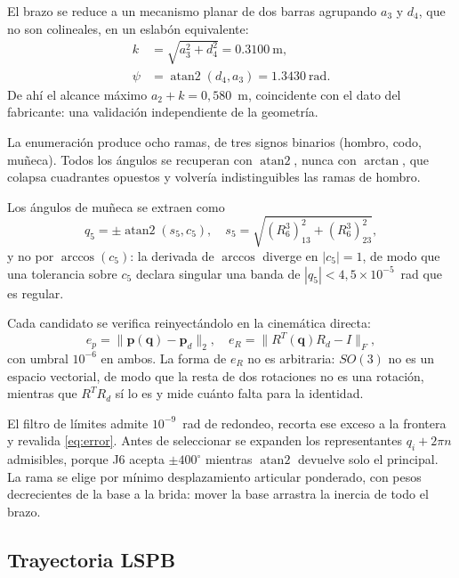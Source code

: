 \documentclass[conference]{IEEEtran}
\begin{document}
El brazo se reduce a un mecanismo planar de dos barras agrupando $a_3$ y
$d_4$, que no son colineales, en un eslabón equivalente:
\begin{equation}
\begin{split}
    k    &= \sqrt{a_3^2+d_4^2} = 0.3100~\text{m},\\
    \psi &= \operatorname{atan2}(d_4,a_3) = 1.3430~\text{rad}.
\end{split}
\label{eq:k}
\end{equation}
De ahí el alcance máximo $a_2+k = 0{,}580$~m, coincidente con el dato
del fabricante: una validación independiente de la geometría.

La enumeración produce ocho ramas, de tres signos binarios (hombro,
codo, muñeca). Todos los ángulos se recuperan con
$\operatorname{atan2}$, nunca con $\arctan$, que colapsa cuadrantes
opuestos y volvería indistinguibles las ramas de hombro.

Los ángulos de muñeca se extraen como
\begin{equation}
    q_5 = \pm\operatorname{atan2}(s_5,c_5),
    \quad s_5=\sqrt{(R^3_6)_{13}^2+(R^3_6)_{23}^2},
    \label{eq:q5}
\end{equation}
y no por $\arccos(c_5)$: la derivada de $\arccos$ diverge en
$|c_5|=1$, de modo que una tolerancia sobre $c_5$ declara singular una
banda de $|q_5|<4{,}5\times10^{-5}$~rad que es regular.

Cada candidato se verifica reinyectándolo en la cinemática directa:
\begin{equation}
    e_p = \lVert\bm{p}(\bm{q})-\bm{p}_d\rVert_2,\quad
    e_R = \lVert R^{T}(\bm{q})R_d - I\rVert_F,
    \label{eq:error}
\end{equation}
con umbral $10^{-6}$ en ambos. La forma de $e_R$ no es arbitraria:
$SO(3)$ no es un espacio vectorial, de modo que la resta de dos
rotaciones no es una rotación, mientras que $R^{T}R_d$ sí lo es y mide
cuánto falta para la identidad.

El filtro de límites admite $10^{-9}$~rad de redondeo, recorta ese
exceso a la frontera y revalida \eqref{eq:error}. Antes de seleccionar
se expanden los representantes $q_i+2\pi n$ admisibles, porque J6
acepta $\pm400^\circ$ mientras $\operatorname{atan2}$ devuelve solo el
principal. La rama se elige por mínimo desplazamiento articular
ponderado, con pesos decrecientes de la base a la brida: mover la base
arrastra la inercia de todo el brazo.

\subsection{Trayectoria LSPB}
\end{document}
